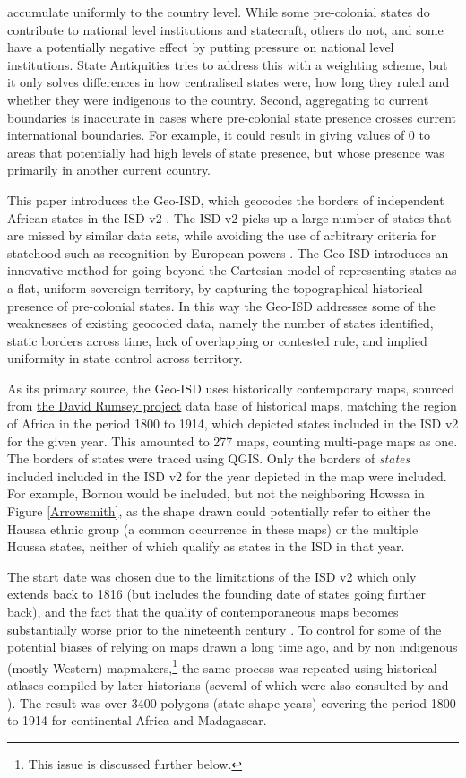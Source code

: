 \documentclass[12pt]{article}
\begin{document}
accumulate uniformly to the country level. While some pre-colonial states do
contribute to national level institutions and statecraft, others do not, and
some have a potentially negative effect by putting pressure on national level
institutions. State Antiquities tries to address this with a weighting scheme,
but it only solves differences in how centralised states were, how long they
ruled and whether they were indigenous to the country. Second, aggregating to
current boundaries is inaccurate in cases where pre-colonial state presence
crosses current international boundaries. For example, it could result in giving
values of 0 to areas that potentially had high levels of state presence, but
whose presence was primarily in another current country.

This paper introduces the Geo-ISD, which geocodes the borders of independent
African states in the ISD v2 \citep{Butcher2020}. The ISD v2 picks up a large
number of states that are missed by similar data sets, while avoiding the use of
arbitrary criteria for statehood such as recognition by European powers
\citep{Butcher2020}. The Geo-ISD introduces an innovative method for going
beyond the Cartesian model of representing states as a flat, uniform sovereign
territory, by capturing the topographical historical presence of pre-colonial
states. In this way the Geo-ISD addresses some of the weaknesses of existing
geocoded data, namely the number of states identified, static borders across
time, lack of overlapping or contested rule, and implied uniformity in state
control across territory.

As its primary source, the Geo-ISD uses historically contemporary maps, sourced
from \href{https://www.davidrumsey.com}{the David Rumsey project} data base of
historical maps, matching the region of Africa in the period 1800 to 1914, which
depicted states included in the ISD v2 for the given year. This amounted to 277
maps, counting multi-page maps as one. The borders of states were traced using
QGIS. Only the borders of \textit{states} included included in the ISD v2 for
the year depicted in the map were included. For example, Bornou would be
included, but not the neighboring Howssa in Figure \ref{Arrowsmith}, as the
shape drawn could potentially refer to either the Haussa ethnic group (a common
occurrence in these maps) or the multiple Houssa states, neither of which
qualify as states in the ISD in that year. 

The start date was chosen due to the limitations of the ISD v2 which only extends
back to 1816 (but includes the founding date of states going further back), and
the fact that the quality of contemporaneous maps becomes substantially worse
prior to the nineteenth century \citep{Bassett_1994}. To control for some of the
potential biases of relying on maps drawn a long time ago, and by non indigenous
(mostly Western) mapmakers,\footnote{This issue is discussed further below.} the
same process was repeated using historical atlases compiled by later historians
(several of which were also consulted by \citet{Depetris-Chauvin2016} and
\citet{Paine2019}). The result was over 3400 polygons (state-shape-years)
covering the period 1800 to 1914 for continental Africa and Madagascar. 
\end{document}
